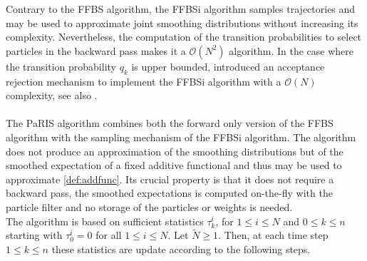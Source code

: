 \documentclass[12pt]{article}
\newcommand{\eqsp}{\;}
\newcommand{\1}{\mathrm{1}}
\begin{document}
Contrary to the FFBS algorithm, the FFBSi algorithm samples trajectories and may be used to approximate joint smoothing distributions without increasing its complexity.
 Nevertheless, the computation of the transition probabilities to select particles in the backward pass makes it a $\mathcal{O}(N^2)$ algorithm. In the case where the transition probability $q_k$ is upper bounded, \cite{douc:garivier:moulines:olsson:2011} introduced an acceptance rejection mechanism to implement the FFBSi algorithm with a $\mathcal{O}(N)$ complexity, see also \cite{dubarry:lecorff:2011}.\\
 \\
The PaRIS algorithm combines both the forward only version of the FFBS algorithm with the sampling mechanism of the FFBSi algorithm. 
The algorithm does not produce an approximation of the smoothing distributions but of the smoothed expectation of a fixed additive functional and thus  may be used to approximate \eqref{def:addfunc}. 
Its crucial property is that it does not require a backward pass, the smoothed expectations is computed on-the-fly with the particle filter and no storage of the particles or weights is needed.\\ 
The algorithm is based on sufficient statistics $\tau^i_k$, for $1\le i\le N$ and $0\le k \le n$ starting with $\tau^i_0 = 0$ for all $1\le i\le N$. Let $\tilde{N}\ge 1$. Then, at each time step $1\le k \le n$ these statistics are update according to the following steps.
\end{document}
